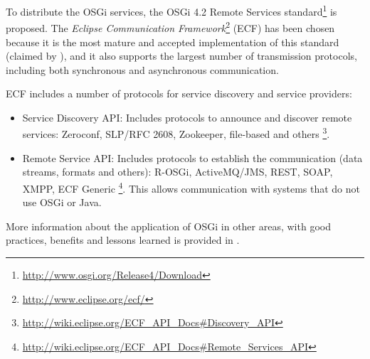 To distribute the OSGi services, the OSGi 4.2 Remote Services
standard\footnote{\url{http://www.osgi.org/Release4/Download}} is proposed.  The
 {\em Eclipse Communication Framework}\footnote{\url{http://www.eclipse.org/ecf/}} (ECF) has
 been chosen because it is the most mature and accepted implementation of this standard
 (claimed by  \cite{petzold2011dynamic}), %
and it also supports the largest number of transmission protocols,
including both synchronous and asynchronous communication.  %

ECF includes a number of protocols for service discovery and service providers:
\begin{itemize}
\item Service Discovery API: Includes protocols to announce and discover remote services: Zeroconf, SLP/RFC 2608, Zookeeper, file-based and others \footnote{\url{http://wiki.eclipse.org/ECF_API_Docs\#Discovery_API}}.
\item Remote Service API: Includes protocols to establish the communication (data streams, formats and others): R-OSGi, ActiveMQ/JMS, REST, SOAP, XMPP, ECF Generic \footnote{\url{http://wiki.eclipse.org/ECF_API_Docs\#Remote_Services_API}}. This allows communication with systems that do not use OSGi or Java.
\end{itemize}

More information about the application of OSGi in other areas, with
good practices, benefits and lessons learned is provided in \cite{GarciaSanchez2013Gateway}. 





